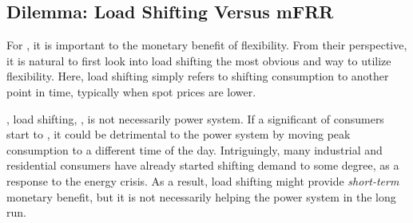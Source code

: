 



\IEEEpubidadjcol

\vspace{-1mm}
\subsection{Dilemma: Load Shifting Versus mFRR}
%
For , it is important to  the monetary benefit of flexibility.  From their perspective, it is natural to first look into load shifting  the most obvious and  way to utilize flexibility. Here, load shifting simply refers to shifting consumption to another point in time, typically when spot prices are lower. 

, load shifting, , is not necessarily  power system.
If a significant  of consumers start to , it could be detrimental to the power system by moving  peak consumption to a different time of the day. 
Intriguingly, many industrial and residential consumers have already started shifting demand to some degree, as a response to the energy crisis. 
As a result, load shifting might provide \textit{short-term} monetary benefit, but it is not necessarily helping the power system in the long run.

